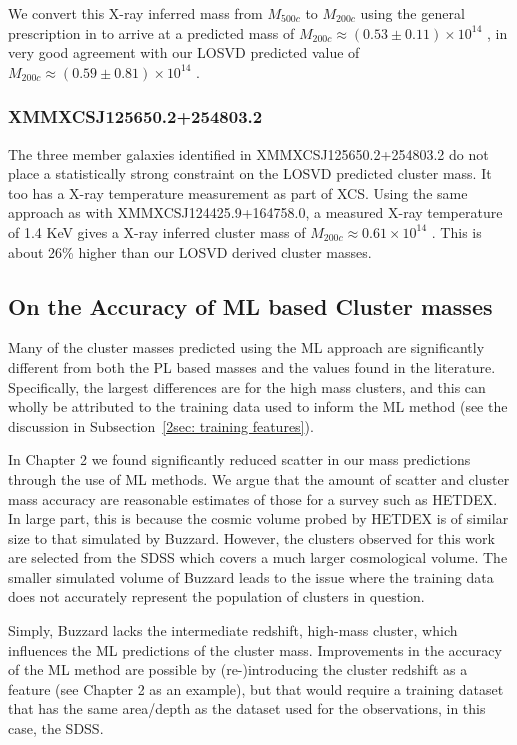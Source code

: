 We convert this X-ray inferred mass from $M_{500c}$ to $M_{200c}$ using the general prescription in \cite{Hu2003} to arrive at a predicted mass of $M_{200c} \approx (0.53\pm0.11)\times10^{14}$ \Msol, in very good agreement with our LOSVD predicted value of $M_{200c} \approx (0.59\pm0.81)\times10^{14}$ \Msol.

\subsubsection{XMMXCSJ125650.2+254803.2}
The three member galaxies identified in XMMXCSJ125650.2+254803.2 do not place a statistically strong constraint on the LOSVD predicted cluster mass. It too has a X-ray temperature measurement as part of XCS. Using the same approach as with XMMXCSJ124425.9+164758.0, a measured X-ray temperature of 1.4 KeV gives a X-ray inferred cluster mass of $M_{200c} \approx 0.61\times10^{14}$ \Msol. This is about 26\% higher than our LOSVD derived cluster masses. 

\subsection{On the Accuracy of ML based Cluster masses}
Many of the cluster masses predicted using the ML approach are significantly different from both the PL based masses and the values found in the literature. Specifically, the largest differences are for the high mass clusters, and this can wholly be attributed to the training data used to inform the ML method (see the discussion in Subsection~\ref{2sec: training features}). 

In Chapter 2 we found significantly reduced scatter in our mass predictions through the use of ML methods. We argue that the amount of scatter and cluster mass accuracy are reasonable estimates of those for a survey such as HETDEX. In large part, this is because the cosmic volume probed by HETDEX is of similar size to that simulated by Buzzard. However, the clusters observed for this work are selected from the SDSS which covers a much larger cosmological volume. The smaller simulated volume of Buzzard leads to the issue where the training data does not accurately represent the population of clusters in question.

Simply, Buzzard lacks the intermediate redshift, high-mass cluster, which influences the ML predictions of the cluster mass. Improvements in the accuracy of the ML method are possible by (re-)introducing the cluster redshift as a feature (see Chapter 2 as an example), but that would require a training dataset that has the same area/depth as the dataset used for the observations, in this case, the SDSS.

